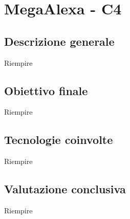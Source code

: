 \section{MegaAlexa - C4} \label{c4}
    \subsection{Descrizione generale}
    Riempire

    \subsection{Obiettivo finale}
    Riempire

    \subsection{Tecnologie coinvolte}
    Riempire

    \subsection{Valutazione conclusiva}
    Riempire

